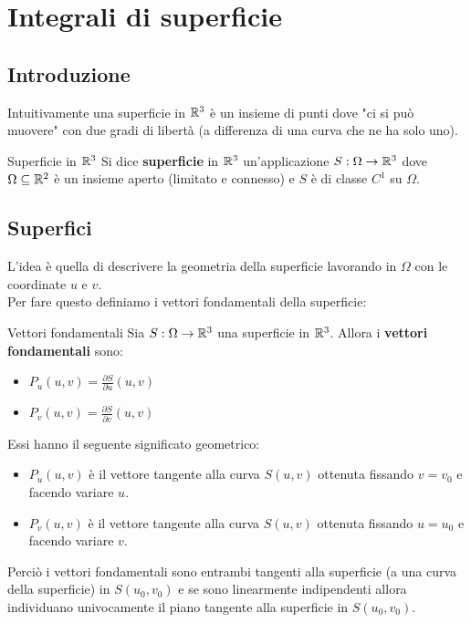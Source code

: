 \chapter{Integrali di superficie}

\section{Introduzione}
Intuitivamente una superficie in $\mathbb{R}^3$ è un insieme di punti dove "ci si può muovere" con due gradi di libertà (a differenza di una curva che ne ha solo uno).

\begin{definizione}{Superficie in $\mathbb{R}^3$}
  Si dice \textbf{superficie} in $\mathbb{R}^3$ un'applicazione $S:\Omega\to\mathbb{R}^3$ dove $\Omega\subseteq\mathbb{R}^2$ è un insieme aperto (limitato e connesso) e $S$ è di classe $C^1$ su $\Omega$.
\end{definizione}

\section{Superfici}
L'idea è quella di descrivere la geometria della superficie lavorando in $\Omega$ con le coordinate $u$ e $v$.\\
Per fare questo definiamo i vettori fondamentali della superficie:
\begin{definizione}{Vettori fondamentali}
  Sia $S:\Omega\to\mathbb{R}^3$ una superficie in $\mathbb{R}^3$. Allora i \textbf{vettori fondamentali} sono:
  \begin{itemize}
    \item $P_u(u,v)=\frac{\partial S}{\partial u}(u,v)$
    \item $P_v(u,v)=\frac{\partial S}{\partial v}(u,v)$
  \end{itemize}
\end{definizione}
Essi hanno il seguente significato geometrico:
\begin{itemize}
  \item $P_u(u,v)$ è il vettore tangente alla curva $S(u,v)$ ottenuta fissando $v=v_0$ e facendo variare $u$.
  \item $P_v(u,v)$ è il vettore tangente alla curva $S(u,v)$ ottenuta fissando $u=u_0$ e facendo variare $v$.
\end{itemize}
Perciò i vettori fondamentali sono entrambi tangenti alla superficie (a una curva della superficie) in $S(u_0,v_0)$ e se sono linearmente indipendenti allora individuano univocamente il piano tangente alla superficie in $S(u_0,v_0)$.

